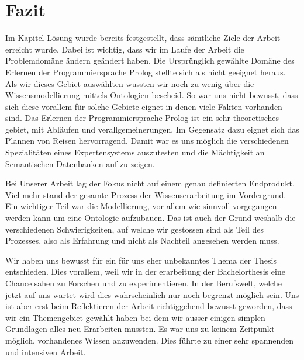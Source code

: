 \chapter{Fazit}
\label{chap:fazit}


Im Kapitel Lösung wurde bereits festgestellt, dass sämtliche Ziele der Arbeit erreicht wurde. Dabei ist wichtig, dass wir im Laufe der Arbeit die Problemdomäne ändern geändert haben. Die Ursprünglich gewählte Domäne des Erlernen der Programmiersprache Prolog stellte sich als nicht geeignet heraus. Als wir dieses Gebiet auswählten wussten wir noch zu wenig über die Wissensmodellierung mittels Ontologien bescheid. So war uns nicht bewusst, dass sich diese vorallem für solche Gebiete eignet in denen viele Fakten vorhanden sind. Das Erlernen der Programmiersprache Prolog ist ein sehr theoretisches gebiet, mit Abläufen und verallgemeinerungen. Im Gegensatz dazu eignet sich das Plannen von Reisen hervorragend. Damit war es uns möglich die verschiedenen Spezialitäten eines Expertensystems auszutesten und die Mächtigkeit an Semantischen Datenbanken auf zu zeigen.

Bei Unserer Arbeit lag der Fokus nicht auf einem genau definierten Endprodukt. Viel mehr stand der gesamte Prozess der Wissenserarbeitung im Vordergrund. Ein wichtiger Teil war die Modellierung, vor allem wie sinnvoll vorgegangen werden kann um eine Ontologie aufzubauen. Das ist auch der Grund weshalb die verschiedenen Schwierigkeiten, auf welche wir gestossen sind als Teil des Prozesses, also als Erfahrung und nicht als Nachteil angesehen werden muss. 

Wir haben uns bewusst für ein für uns eher unbekanntes Thema der Thesis entschieden. Dies vorallem, weil wir in der erarbeitung der Bachelorthesis eine Chance sahen zu Forschen und zu experimentieren. In der Berufswelt, welche jetzt auf uns wartet wird dies wahrscheinlich nur noch begrenzt möglich sein. Uns ist aber erst beim Reflektieren der Arbeit richtiggehend bewusst geworden, dass wir ein Themengebiet gewählt haben bei dem wir ausser einigen simplen Grundlagen alles neu Erarbeiten mussten. Es war uns zu keinem Zeitpunkt möglich, vorhandenes Wissen anzuwenden. Dies führte zu einer sehr spannenden und intensiven Arbeit.


